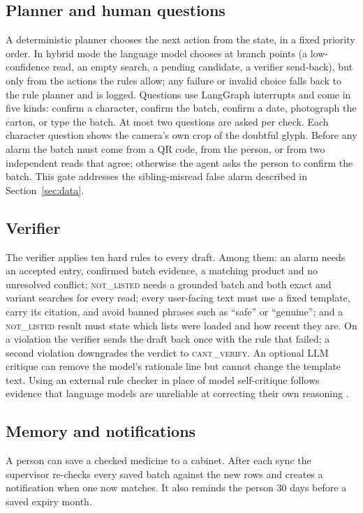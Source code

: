 \subsection{Planner and human questions}
A deterministic planner chooses the next action from the state, in a fixed priority order. In hybrid mode the language model chooses at branch points (a low-confidence read, an empty search, a pending candidate, a verifier send-back), but only from the actions the rules allow; any failure or invalid choice falls back to the rule planner and is logged. Questions use LangGraph interrupts and come in five kinds: confirm a character, confirm the batch, confirm a date, photograph the carton, or type the batch. At most two questions are asked per check. Each character question shows the camera's own crop of the doubtful glyph. Before any alarm the batch must come from a QR code, from the person, or from two independent reads that agree; otherwise the agent asks the person to confirm the batch. This gate addresses the sibling-misread false alarm described in Section~\ref{sec:data}.

\subsection{Verifier}
The verifier applies ten hard rules to every draft. Among them: an alarm needs an accepted entry, confirmed batch evidence, a matching product and no unresolved conflict; \textsc{not\_listed} needs a grounded batch and both exact and variant searches for every read; every user-facing text must use a fixed template, carry its citation, and avoid banned phrases such as ``safe'' or ``genuine''; and a \textsc{not\_listed} result must state which lists were loaded and how recent they are. On a violation the verifier sends the draft back once with the rule that failed; a second violation downgrades the verdict to \textsc{cant\_verify}. An optional LLM critique can remove the model's rationale line but cannot change the template text. Using an external rule checker in place of model self-critique follows evidence that language models are unreliable at correcting their own reasoning \cite{huang2024cannot,kambhampati2024llmmodulo}.

\subsection{Memory and notifications}
A person can save a checked medicine to a cabinet. After each sync the supervisor re-checks every saved batch against the new rows and creates a notification when one now matches. It also reminds the person 30 days before a saved expiry month.

